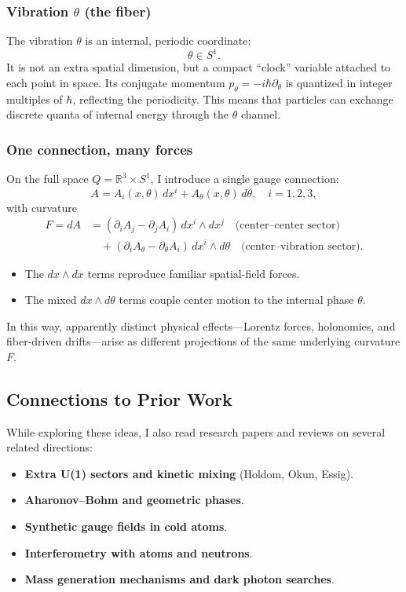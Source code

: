 \subsubsection*{Vibration $\theta$ (the fiber)}
The vibration $\theta$ is an internal, periodic coordinate:
\[
\theta \in S^1 .
\]
It is not an extra spatial dimension, but a compact ``clock'' variable attached to each point in space.
Its conjugate momentum $p_\theta = -i\hbar \partial_\theta$ is quantized in integer multiples of $\hbar$, 
reflecting the periodicity. This means that particles can exchange discrete quanta of internal energy 
through the $\theta$ channel.

\subsubsection*{One connection, many forces}
On the full space $Q = \mathbb{R}^3 \times S^1$, I introduce a single gauge connection:
\begin{equation}
A = A_i(x,\theta)\, dx^i + A_\theta(x,\theta)\, d\theta, \quad i=1,2,3,
\end{equation}
with curvature
\begin{align}
F = dA 
&= (\partial_i A_j - \partial_j A_i)\, dx^i \wedge dx^j \quad \text{(center--center sector)} \\
&\quad + (\partial_i A_\theta - \partial_\theta A_i)\, dx^i \wedge d\theta 
\quad \text{(center--vibration sector)} .
\end{align}

\begin{itemize}
  \item The $dx \wedge dx$ terms reproduce familiar spatial-field forces.
  \item The mixed $dx \wedge d\theta$ terms couple center motion to the internal phase $\theta$.
\end{itemize}

In this way, apparently distinct physical effects---Lorentz forces, holonomies, and 
fiber-driven drifts---arise as different projections of the same underlying curvature $F$.

\subsection{Connections to Prior Work}

While exploring these ideas, I also read research papers and reviews on several related directions:
\begin{itemize}
  \item \textbf{Extra U(1) sectors and kinetic mixing} (Holdom, Okun, Essig).
  \item \textbf{Aharonov--Bohm and geometric phases}.
  \item \textbf{Synthetic gauge fields in cold atoms}.
  \item \textbf{Interferometry with atoms and neutrons}.
  \item \textbf{Mass generation mechanisms and dark photon searches}.
\end{itemize}

